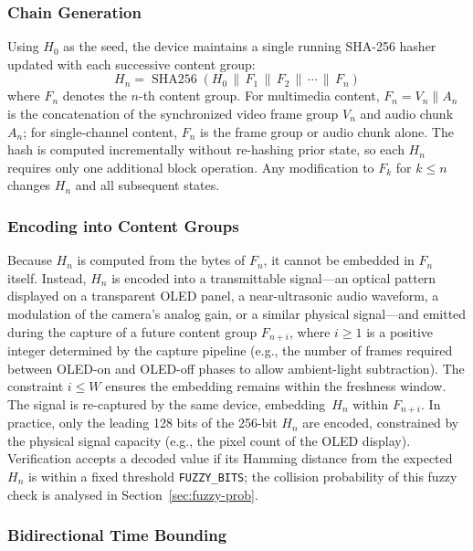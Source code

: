 \documentclass[11pt]{article}
\begin{document}
\subsubsection{Chain Generation}

Using $H_0$ as the seed, the device maintains a single running SHA-256 hasher
updated with each successive content group:
\begin{equation}
  H_n = \operatorname{SHA256}(H_0 \,\|\, F_1 \,\|\, F_2 \,\|\, \cdots \,\|\, F_n)
  \label{eq:chain}
\end{equation}%
where $F_n$ denotes the $n$-th content group. For multimedia content, $F_n = V_n \| A_n$
is the concatenation of the synchronized video frame group $V_n$ and audio chunk $A_n$;
for single-channel content, $F_n$ is the frame group or audio chunk alone.
The hash is computed incrementally without re-hashing prior state, so each $H_n$
requires only one additional block operation. Any modification to $F_k$ for
$k \leq n$ changes $H_n$ and all subsequent states.

\subsubsection{Encoding into Content Groups}

Because $H_n$ is computed from the bytes of $F_n$, it cannot be embedded in $F_n$
itself. Instead, $H_n$ is encoded into a transmittable signal---an optical pattern
displayed on a transparent OLED panel, a near-ultrasonic audio waveform, a
modulation of the camera's analog gain, or a similar physical signal---and emitted
during the capture of a future content group $F_{n+i}$, where $i \geq 1$ is a
positive integer determined by the capture pipeline (e.g., the number of frames
required between OLED-on and OLED-off phases to allow ambient-light subtraction).
The constraint $i \leq W$ ensures the embedding remains within the freshness window.
The signal is re-captured by the same device, embedding~$H_n$ within $F_{n+i}$.
In practice, only the leading 128 bits of the 256-bit $H_n$ are encoded, constrained
by the physical signal capacity (e.g., the pixel count of the OLED display).
Verification accepts a decoded value if its Hamming distance from the expected
$H_n$ is within a fixed threshold \texttt{FUZZY\_BITS}; the collision probability
of this fuzzy check is analysed in Section~\ref{sec:fuzzy-prob}.

\subsubsection{Bidirectional Time Bounding}
\label{sec:timebound}
\end{document}
